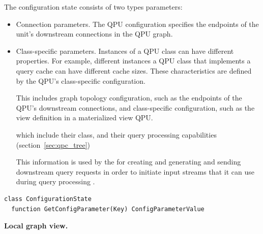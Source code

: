 The configuration state consists of two types parameters:
\begin{itemize}
  \item Connection parameters.
  The QPU configuration specifies the endpoints of the unit's downstream connections in the QPU graph.

  \item Class-specific parameters.
  Instances of a QPU class can have different properties.
  For example, different instances a QPU class that implements a query cache can have different cache sizes.
  These characteristics are defined by the QPU's class-specific configuration.

This includes graph topology configuration, such as the endpoints of the QPU's downstream connections, and
class-specific configuration, such as the view definition in a materialized view QPU.


which include their class, and their query processing capabilities (section~\ref{sec:qpc_tree})

This information is used by the for creating and generating and sending downstream query requests in order to initiate
input streams that it can use during query processing .


\end{itemize}

\begin{lstlisting}[caption={Pseudocode for the QPU's configuration state},captionpos=b,label={lst:qpuconfigstate}]
class ConfigurationState
  function GetConfigParameter(Key) ConfigParameterValue
\end{lstlisting}


\medskip
\noindent
\textbf{Local graph view.}



